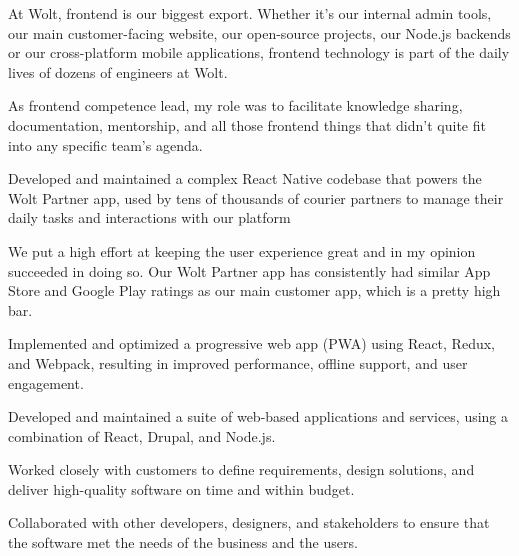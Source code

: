 \documentclass[]{deedy-resume-openfont}
\begin{document}
\begin{tightemize}
\item At Wolt, frontend is our biggest export. Whether it's our internal admin tools, our main customer-facing website, our open-source projects, our Node.js backends or our cross-platform mobile applications, frontend technology is part of the daily lives of dozens of engineers at Wolt.

\item As frontend competence lead, my role was to facilitate knowledge sharing, documentation, mentorship, and all those frontend things that didn't quite fit into any specific team's agenda.
\end{tightemize}
\sectionsep

\begin{tightemize}
\item Developed and maintained a complex React Native codebase that powers the Wolt Partner app, used by tens of thousands of courier partners to manage their daily tasks and interactions with our platform
\item We put a high effort at keeping the user experience great and in my opinion succeeded in doing so. Our Wolt Partner app has consistently had similar App Store and Google Play ratings as our main customer app, which is a pretty high bar.
\end{tightemize}
\sectionsep

\begin{tightemize}
\item Implemented and optimized a progressive web app (PWA) using React, Redux, and Webpack, resulting in improved performance, offline support, and user engagement.
\item Developed and maintained a suite of web-based applications and services, using a combination of React, Drupal, and Node.js.
\item Worked closely with customers to define requirements, design solutions, and deliver high-quality software on time and within budget.
\item Collaborated with other developers, designers, and stakeholders to ensure that the software met the needs of the business and the users.
\end{tightemize}
\sectionsep
\end{document}
